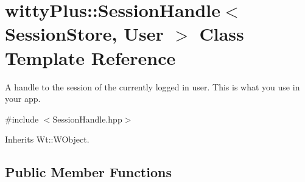 \hypertarget{classwittyPlus_1_1SessionHandle}{
\section{wittyPlus::SessionHandle$<$ SessionStore, User $>$ Class Template Reference}
\label{classwittyPlus_1_1SessionHandle}
}


A handle to the session of the currently logged in user. This is what you use in your app.  




{\ttfamily \#include $<$SessionHandle.hpp$>$}



Inherits Wt::WObject.

\subsection*{Public Member Functions}
